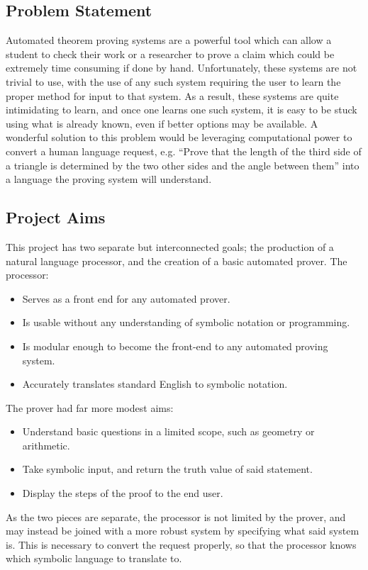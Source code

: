 \documentclass[12pt]{article}
\begin{document}
\subsection{Problem Statement}
Automated theorem proving systems are a powerful tool which can allow a student to check their work or a researcher to prove a claim which could be extremely time consuming if done by hand. Unfortunately, these systems are not trivial to use, with the use of any such system requiring the user to learn the proper method for input to that system. As a result, these systems are quite intimidating to learn, and once one learns one such system, it is easy to be stuck using what is already known, even if better options may be available. A wonderful solution to this problem would be leveraging computational power to convert a human language request, e.g. ``Prove that the length of the third side of a triangle is determined by the two other sides and the angle between them'' into a language the proving system will understand.


\subsection{Project Aims}
This project has two separate but interconnected goals; the production of a natural language processor, and the creation of a basic automated prover. The processor:
\begin{itemize}
\item{Serves as a front end for any automated prover.}
\item{Is usable without any understanding of symbolic notation or programming.}
\item{Is modular enough to become the front-end to any automated proving system.}
\item{Accurately translates standard English to symbolic notation.}
\end{itemize}

The prover had far more modest aims:
\begin{itemize}
\item{Understand basic questions in a limited scope, such as geometry or arithmetic.}
\item{Take symbolic input, and return the truth value of said statement.}
\item{Display the steps of the proof to the end user.}
\end{itemize}

As the two pieces are separate, the processor is not limited by the prover, and may instead be joined with a more robust system by specifying what said system is. This is necessary to convert the request properly, so that the processor knows which symbolic language to translate to.
\end{document}
